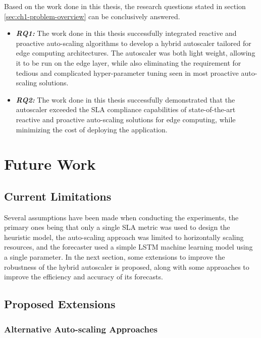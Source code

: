 Based on the work done in this thesis, the research questions stated in section \ref{sec:ch1-problem-overview} can be conclusively answered.

\begin{itemize}
    \item \textbf{\textit{RQ1:}} The work done in this thesis successfully integrated reactive and proactive auto-scaling algorithms to develop a hybrid autoscaler tailored for edge computing architectures. The autoscaler was both light weight, allowing it to be run on the edge layer, while also eliminating the requirement for tedious and complicated hyper-parameter tuning seen in most proactive auto-scaling solutions.
    \item \textbf{\textit{RQ2:}} The work done in this thesis successfully demonstrated that the autoscaler exceeded the SLA compliance capabilities of state-of-the-art reactive and proactive auto-scaling solutions for edge computing, while minimizing the cost of deploying the application.
\end{itemize}

\section{Future Work}
\label{sec:ch7-future-work}

\subsection{Current Limitations}
\label{subsec:ch7-limitations}

Several assumptions have been made when conducting the experiments, the primary ones being that only a single SLA metric was used to design the heuristic model, the auto-scaling approach was limited to horizontally scaling resources, and the forecaster used a simple LSTM machine learning model using a single parameter. In the next section, some extensions to improve the robustness of the hybrid autoscaler is proposed, along with some approaches to improve the efficiency and accuracy of its forecasts.\par

\subsection{Proposed Extensions}
\label{subsec:ch7-extensions}

\subsubsection{Alternative Auto-scaling Approaches}
\label{subsubsec:ch7-alternate-auto}

